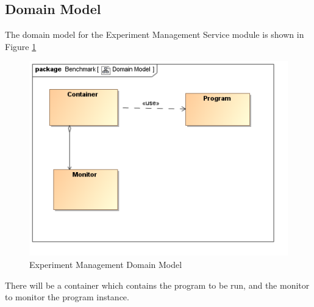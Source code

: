 \subsection{Domain Model}
The domain model for the Experiment Management Service module is shown in Figure \ref{Benchmark Domain Model}
\begin{figure}[H]
  \begin{center}
  \includegraphics[scale=1.0]{../Diagrams and Charts/Benchmark/Domain Model.png}
  \caption{Experiment Management Domain Model}
  \end{center}
  \label{Benchmark Domain Model}
\end{figure}
There will be a container which contains the program to be run, and the monitor to monitor the program instance.\\
